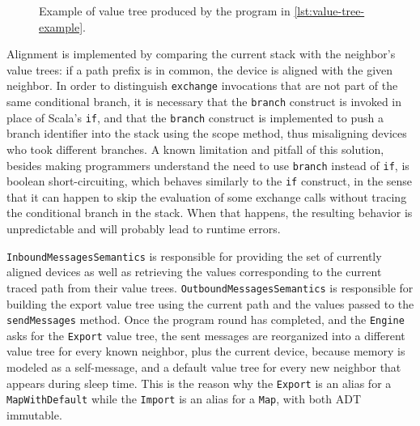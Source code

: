 

\begin{figure}
    \centering
    \caption{Example of value tree produced by the program in \cref{lst:value-tree-example}.}
    \label{fig:value-tree-example}
    \bigskip
    \resizebox{0.5\linewidth}{!}{
        
    }
\end{figure}

Alignment is implemented by comparing the current stack with the neighbor's value trees: if a path prefix is in common, the device is aligned with the given neighbor.
%
In order to distinguish \texttt{exchange} invocations that are not part of the same conditional branch, it is necessary that the \texttt{branch} construct is invoked in place of Scala's \texttt{if}, and that the \texttt{branch} construct is implemented to push a branch identifier into the stack using the scope method, thus misaligning devices who took different branches.
%
A known limitation and pitfall of this solution, besides making programmers understand the need to use \texttt{branch} instead of \texttt{if}, is boolean short-circuiting, which behaves similarly to the \texttt{if} construct, in the sense that it can happen to skip the evaluation of some exchange calls without tracing the conditional branch in the stack.
%
When that happens, the resulting behavior is unpredictable and will probably lead to runtime errors.

\texttt{InboundMessagesSemantics} is responsible for providing the set of currently aligned devices as well as retrieving the values corresponding to the current traced path from their value trees.
%
\texttt{OutboundMessagesSemantics} is responsible for building the export value tree using the current path and the values passed to the \texttt{sendMessages} method.
%
Once the program round has completed, and the \texttt{Engine} asks for the \texttt{Export} value tree, the sent messages are reorganized into a different value tree for every known neighbor, plus the current device, because memory is modeled as a self-message, and a default value tree for every new neighbor that appears during sleep time.
%
This is the reason why the \texttt{Export} is an alias for a \texttt{MapWithDefault} while the \texttt{Import} is an alias for a \texttt{Map}, with both \ac{ADT} immutable.

